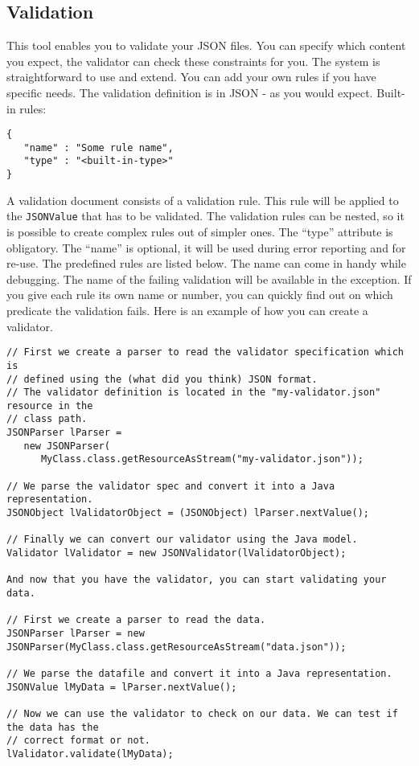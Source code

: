 \documentclass[a4paper]{article}
\begin{document}
 
\subsection{Validation}

This tool enables you to validate your JSON files. You can specify which content you expect, the validator can check these constraints for you. The system is straightforward to use and extend. You can add your own rules if you have specific needs. The validation definition is in JSON - as you would expect. Built-in rules:

\medskip
\begin{lstlisting}
{
   "name" : "Some rule name",
   "type" : "<built-in-type>"
}
\end{lstlisting}
\medskip

A validation document consists of a validation rule. This rule will be applied to the \lstinline{JSONValue} that has to be validated. The validation rules can be nested, so it is possible to create complex rules out of simpler ones. The ``type'' attribute is obligatory.  The  ``name'' is optional, it will be used during error reporting and for re-use.  The predefined rules are listed below. The name can come in handy while debugging. The name of the failing validation will be available in the exception. If you give each rule its own name or number, you can quickly find out on which predicate the validation fails. Here is an example of how you can create a validator.

\medskip
\begin{lstlisting}[basicstyle=\ttfamily\scriptsize{}]
// First we create a parser to read the validator specification which is 
// defined using the (what did you think) JSON format.
// The validator definition is located in the "my-validator.json" resource in the
// class path.
JSONParser lParser = 
   new JSONParser(
      MyClass.class.getResourceAsStream("my-validator.json"));

// We parse the validator spec and convert it into a Java representation.
JSONObject lValidatorObject = (JSONObject) lParser.nextValue();

// Finally we can convert our validator using the Java model.
Validator lValidator = new JSONValidator(lValidatorObject);

And now that you have the validator, you can start validating your data.

// First we create a parser to read the data. 
JSONParser lParser = new JSONParser(MyClass.class.getResourceAsStream("data.json"));

// We parse the datafile and convert it into a Java representation.
JSONValue lMyData = lParser.nextValue();

// Now we can use the validator to check on our data. We can test if the data has the 
// correct format or not. 
lValidator.validate(lMyData);
\end{lstlisting}
\medskip
\end{document}
